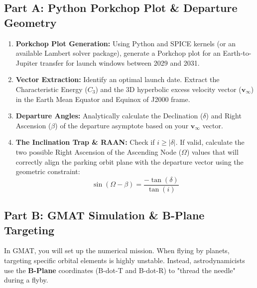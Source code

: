 \documentclass[11pt, letterpaper]{article}
\begin{document}
\subsection*{Part A: Python Porkchop Plot \& Departure Geometry}
\begin{enumerate}
    \item \textbf{Porkchop Plot Generation:} Using Python and SPICE kernels (or an available Lambert solver package), generate a Porkchop plot for an Earth-to-Jupiter transfer for launch windows between 2029 and 2031. 
    \item \textbf{Vector Extraction:} Identify an optimal launch date. Extract the Characteristic Energy ($C_3$) and the 3D hyperbolic excess velocity vector ($\mathbf{v}_\infty$) in the Earth Mean Equator and Equinox of J2000 frame.
    \item \textbf{Departure Angles:} Analytically calculate the Declination ($\delta$) and Right Ascension ($\beta$) of the departure asymptote based on your $\mathbf{v}_\infty$ vector.
    \item \textbf{The Inclination Trap \& RAAN:} Check if $i \ge |\delta|$. If valid, calculate the two possible Right Ascension of the Ascending Node ($\Omega$) values that will correctly align the parking orbit plane with the departure vector using the geometric constraint:
    \begin{equation}
        \sin(\Omega - \beta) = \frac{-\tan(\delta)}{\tan(i)}
    \end{equation}
\end{enumerate}

\subsection*{Part B: GMAT Simulation \& B-Plane Targeting}
In GMAT, you will set up the numerical mission. When flying by planets, targeting specific orbital elements is highly unstable. Instead, astrodynamicists use the \textbf{B-Plane} coordinates (B-dot-T and B-dot-R) to "thread the needle" during a flyby.
\end{document}
